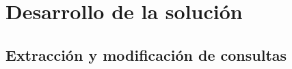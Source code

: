 
\chapter{Desarrollo de la solución}

\section{Extracción y modificación de consultas}\label{d:emc}
